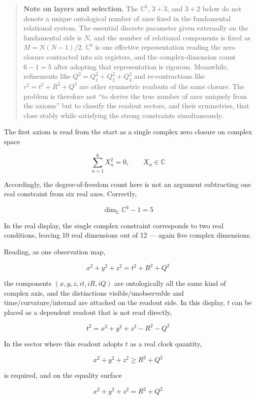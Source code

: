 \documentclass[
  a4paper,
]{article}
\begin{document}
\begin{quote}
\textbf{Note on layers and selection.} The \(\mathbb C^6\), \(3+3\), and
\(3+2\) below do not denote a unique ontological number of axes fixed in
the fundamental relational system. The essential discrete parameter
given externally on the fundamental side is \(N\), and the number of
relational components is fixed as \(M=N(N-1)/2\). \(\mathbb C^6\) is one
effective representation reading the zero closure contracted into six
registers, and the complex-dimension count \(6-1=5\) after adopting that
representation is rigorous. Meanwhile, refinements like
\(Q^2=Q_1^2+Q_2^2+Q_3^2\) and re-contractions like \(r^2=t^2+R^2+Q^2\)
are other symmetric readouts of the same closure. The problem is
therefore not ``to derive the true number of axes uniquely from the
axioms'' but to classify the readout sectors, and their symmetries, that
close stably while satisfying the strong constraints simultaneously.
\end{quote}

The first axiom is read from the start as a single complex zero closure
on complex space

\[
\boxed{\sum_{n=1}^{6}X_n^2=0,\qquad X_n\in\mathbb C}
\]

Accordingly, the degree-of-freedom count here is not an argument
subtracting one real constraint from six real axes. Correctly,

\[
\boxed{\dim_{\mathbb C}\mathbb C^6-1=5}
\]

In the real display, the single complex constraint corresponds to two
real conditions, leaving 10 real dimensions out of 12 --- again five
complex dimensions.

Reading, as one observation map,

\[
\boxed{x^2+y^2+z^2=t^2+R^2+Q^2}
\]

the components \((x,y,z,it,iR,iQ)\) are ontologically all the same kind
of complex axis, and the distinctions visible/unobservable and
time/curvature/internal are attached on the readout side. In this
display, \(t\) can be placed as a dependent readout that is not read
directly,

\[
\boxed{t^2=x^2+y^2+z^2-R^2-Q^2}
\]

In the sector where this readout adopts \(t\) as a real clock quantity,

\[
\boxed{
x^2+y^2+z^2\ge R^2+Q^2
}
\]

is required, and on the equality surface

\[
\boxed{
x^2+y^2+z^2=R^2+Q^2
}
\]
\end{document}

